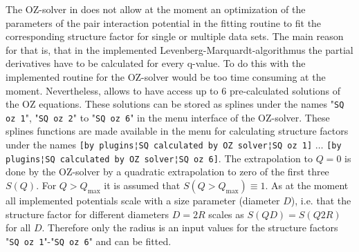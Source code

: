 The OZ-solver in \SASfit does not allow at the moment an optimization of the parameters of the pair interaction potential in the fitting routine to fit the corresponding structure factor for single or multiple data sets. The main reason for that is, that in the implemented Levenberg-Marquardt-algorithmus the partial derivatives have to be calculated for every q-value. To do this with the implemented routine for the OZ-solver would be too time consuming at the moment. Nevertheless, \SASfit allows to have access up to 6 pre-calculated solutions of the OZ equations. These solutions can be stored as splines under the names "\texttt{SQ oz 1}", "\texttt{SQ oz 2}"  to "\texttt{SQ oz 6}" in the menu interface of the OZ-solver. These splines functions are made available in the menu for calculating structure factors under the names \texttt{[by plugins¦SQ calculated by OZ solver¦SQ oz 1]} $\ldots$ \texttt{[by plugins¦SQ calculated by OZ solver¦SQ oz 6]}. The extrapolation to $Q=0$ is done by the OZ-solver by a quadratic extrapolation to zero of the first three $S(Q)$. For $Q>Q_\textrm{max}$ it is assumed that $S(Q>Q_\textrm{max})\equiv 1$. As at the moment all implemented potentials scale with a size parameter (diameter $D$), i.e. that the structure factor for different diameters $D=2R$ scales as $S(QD)=S(Q2R)$ for all $D$. Therefore only the radius is an input values for the structure factors "\texttt{SQ oz 1}"-"\texttt{SQ oz 6}" and can be fitted. 